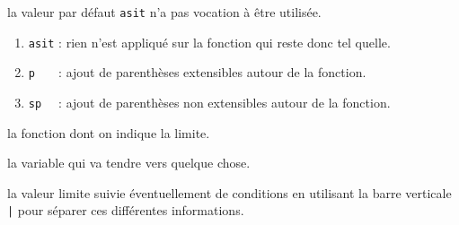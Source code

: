 \documentclass[12pt,a4paper]{article}
\begin{document}


\IDoption{}  la valeur par défaut \verb+asit+ n'a pas vocation à être utilisée. 
\begin{enumerate}
	\item \verb+asit+ : rien n'est appliqué sur la fonction qui reste donc tel quelle.
	
	\item \verb+p   + : ajout de parenthèses extensibles autour de la fonction.

	\item \verb+sp  + : ajout de parenthèses non extensibles autour de la fonction.
\end{enumerate}


 la fonction dont on indique la limite.

 la variable qui va tendre vers quelque chose.

 la valeur limite suivie éventuellement de conditions en utilisant la barre verticale \verb+|+ pour séparer ces différentes informations.
\end{document}
